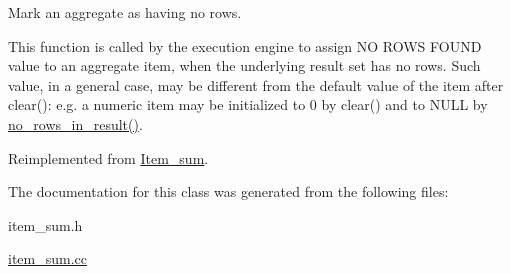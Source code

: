Mark an aggregate as having no rows.

This function is called by the execution engine to assign \textquotesingle{}NO R\+O\+WS F\+O\+U\+ND\textquotesingle{} value to an aggregate item, when the underlying result set has no rows. Such value, in a general case, may be different from the default value of the item after \textquotesingle{}clear()\textquotesingle{}\+: e.\+g. a numeric item may be initialized to 0 by clear() and to N\+U\+LL by \mbox{\hyperlink{classItem__sum__variance_a510a0268827bac0bf1fc4cf933813745}{no\+\_\+rows\+\_\+in\+\_\+result()}}. 

Reimplemented from \mbox{\hyperlink{classItem__sum_aba62f301a61ca3e686abf23e109bb0a8}{Item\+\_\+sum}}.



The documentation for this class was generated from the following files\+:\begin{DoxyCompactItemize}
\item 
item\+\_\+sum.\+h\item 
\mbox{\hyperlink{item__sum_8cc}{item\+\_\+sum.\+cc}}\end{DoxyCompactItemize}
